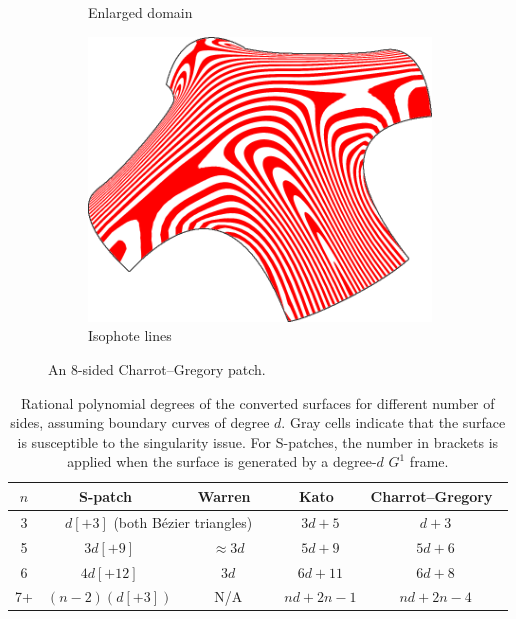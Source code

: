 \documentclass[9pt,academicons]{article}
\begin{document}
\begin{figure}[h!]
\begin{subfigure}{.3\textwidth}
    \caption{Enlarged domain}
    \label{fig:8sided-enlarged}
  \end{subfigure}
  \hfill
  \begin{subfigure}{.3\textwidth}
    \centering
    \includegraphics[width=.883\textwidth]{images/8sided-3.png}
    \caption{Isophote lines}
    \label{fig:8sided-iso}
  \end{subfigure}
  \caption{An 8-sided Charrot--Gregory patch.}
  \label{fig:8sided}
\end{figure}

\begin{table}[h!]
  \centering
  \begin{tabular}{c|c|c|c|c}
    $n$ & S-patch~\cite{Loop:1989} & Warren~\cite{Warren:1992} & Kato~\cite{Kato:1991} & Charrot--Gregory~\cite{Charrot:1984} \\ \hline
    3 & \multicolumn{2}{c|}{$d[+3]$ (both B\'ezier triangles)} & \cellcolor{light-gray}$3d+5$ & $d+3$ \\ \hline
    5 & \cellcolor{light-light-gray}$3d[+9]$ & $\approx 3d$ & \cellcolor{light-gray}$5d+9$ & $5d+6$ \\ \hline
    6 & \cellcolor{light-light-gray}$4d[+12]$ & $3d$ & \cellcolor{light-gray}$6d+11$ & $6d+8$ \\ \hline
    7+ & \cellcolor{light-gray}$(n-2)(d[+3])$ & $\qquad$N/A$\qquad$ & \cellcolor{light-gray}$nd+2n-1$ & \cellcolor{light-gray}$nd+2n-4$ \\ \hline
  \end{tabular}
  \caption{Rational polynomial degrees of the converted surfaces for different number of sides,
    assuming boundary curves of degree $d$. Gray cells indicate that the surface is susceptible to
    the singularity issue.
    For S-patches, the number in brackets is applied
    when the surface is generated by a degree-$d$ $G^1$ frame.}
  \label{tab:degrees}
\end{table}
\end{document}
